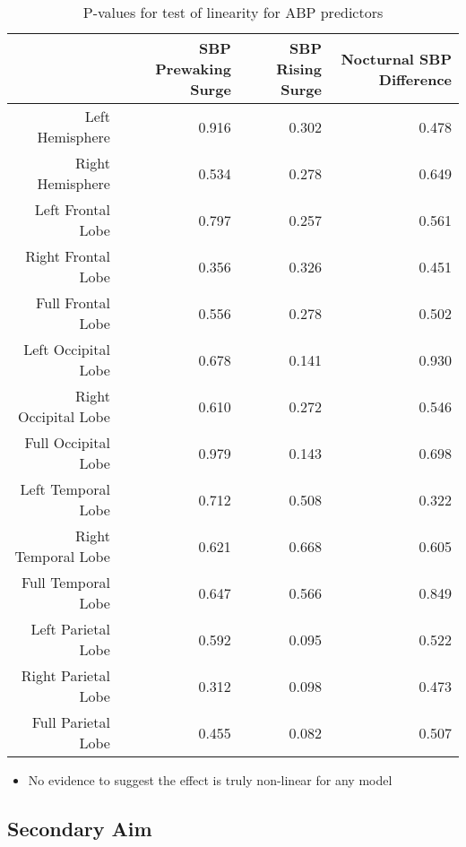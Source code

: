 \documentclass[10pt]{article}\usepackage[]{graphicx}\usepackage[]{color}
\begin{document}
\begin{table}[ht]
\centering
\caption{P-values for test of linearity for ABP predictors} 
\begin{tabular}{rrrr}
  \hline
 & SBP Prewaking Surge & SBP Rising Surge & Nocturnal SBP Difference \\ 
  \hline
Left Hemisphere & 0.916 & 0.302 & 0.478 \\ 
  Right Hemisphere & 0.534 & 0.278 & 0.649 \\ 
  Left Frontal Lobe & 0.797 & 0.257 & 0.561 \\ 
  Right Frontal Lobe & 0.356 & 0.326 & 0.451 \\ 
  Full Frontal Lobe & 0.556 & 0.278 & 0.502 \\ 
  Left Occipital Lobe & 0.678 & 0.141 & 0.930 \\ 
  Right Occipital Lobe & 0.610 & 0.272 & 0.546 \\ 
  Full Occipital Lobe & 0.979 & 0.143 & 0.698 \\ 
  Left Temporal Lobe & 0.712 & 0.508 & 0.322 \\ 
  Right Temporal Lobe & 0.621 & 0.668 & 0.605 \\ 
  Full Temporal Lobe & 0.647 & 0.566 & 0.849 \\ 
  Left Parietal Lobe & 0.592 & 0.095 & 0.522 \\ 
  Right Parietal Lobe & 0.312 & 0.098 & 0.473 \\ 
  Full Parietal Lobe & 0.455 & 0.082 & 0.507 \\ 
   \hline
\end{tabular}
\end{table}


\begin{itemize}
  \item No evidence to suggest the effect is truly non-linear for any model
\end{itemize}

\clearpage
\subsection{Secondary Aim}
\end{document}
